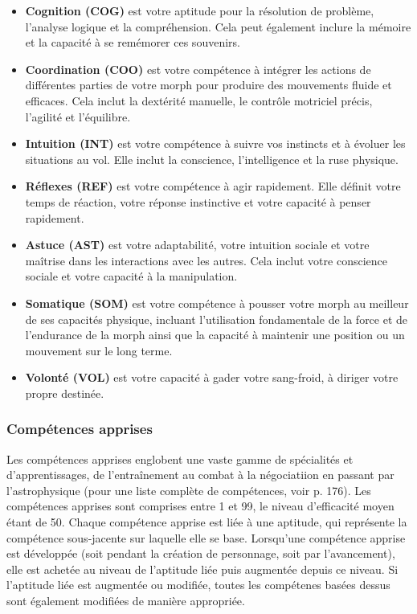 \begin{itemize} \item \textbf{Cognition (COG)} est votre aptitude pour la résolution de problème, l'analyse logique et la compréhension. Cela peut également inclure la mémoire et la capacité à se remémorer ces souvenirs. \item \textbf{Coordination (COO)} est votre compétence à intégrer les actions de différentes parties de votre morph pour produire des mouvements fluide et efficaces. Cela inclut la dextérité manuelle, le contrôle motriciel précis, l'agilité et l'équilibre. \item \textbf{Intuition (INT)} est votre compétence à suivre vos instincts et à évoluer les situations au vol. Elle inclut la conscience, l'intelligence et la ruse physique. \item \textbf{Réflexes (REF)} est votre compétence à agir rapidement. Elle définit votre temps de réaction, votre réponse instinctive et votre capacité à penser rapidement. \item \textbf{Astuce (AST)} est votre adaptabilité, votre intuition sociale et votre maîtrise dans les interactions avec les autres. Cela inclut votre conscience sociale et votre capacité à la manipulation. \item \textbf{Somatique (SOM)} est votre compétence à pousser votre morph au meilleur de ses capacités physique, incluant l'utilisation fondamentale de la force et de l'endurance de la morph ainsi que la capacité à maintenir une position ou un mouvement sur le long terme. \item \textbf{Volonté (VOL)} est votre capacité à gader votre sang-froid, à diriger votre propre destinée. \end{itemize} 

\subsubsection{Compétences apprises} \label{sec:learned-skills} 

Les compétences apprises englobent une vaste gamme de spécialités et d'apprentissages, de l'entraînement au combat à la négociatiion en passant par l'astrophysique (pour une liste complète de compétences, voir p. 176). Les compétences apprises sont comprises entre 1 et 99, le niveau d'efficacité moyen étant de 50. Chaque compétence apprise est liée à une aptitude, qui représente la compétence sous-jacente sur laquelle elle se base. Lorsqu'une compétence apprise est développée (soit pendant la création de personnage, soit par l'avancement), elle est achetée au niveau de l'aptitude liée puis augmentée depuis ce niveau. Si l'aptitude liée est augmentée ou modifiée, toutes les compétenes basées dessus sont également modifiées de manière appropriée. 

